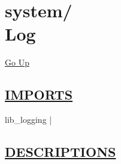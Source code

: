 \chapter*{\color{headfile}
{\large system\slash\hspace{0pt}}
 \\
Log
}
\hypertarget{ecldoc:toc:system.Log}{}
\hyperlink{ecldoc:toc:root/system}{Go Up}

\section*{\underline{\textsf{IMPORTS}}}
\begin{doublespace}
{\large
lib\_logging |
}
\end{doublespace}

\section*{\underline{\textsf{DESCRIPTIONS}}}

